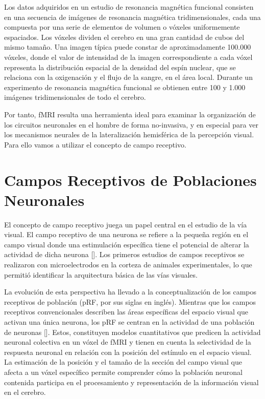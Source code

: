 Los datos adquiridos en un estudio de resonancia magnética funcional consisten en una secuencia de imágenes de resonancia magnética tridimensionales, cada una compuesta por una serie de elementos de volumen o vóxeles uniformemente espaciados. Los vóxeles dividen el cerebro en una gran cantidad de cubos del mismo tamaño. Una imagen típica puede constar de aproximadamente 100.000 vóxeles, donde el valor de intensidad de la imagen correspondiente a cada vóxel representa la distribución espacial de la densidad del espín nuclear, que se relaciona con la oxigenación y el flujo de la sangre, en el área local. Durante un experimento de resonancia magnética funcional se obtienen entre 100 y 1.000 imágenes tridimensionales de todo el cerebro. 

Por tanto, fMRI resulta una herramienta ideal para examinar la organización de los circuitos neuronales en el hombre de forma no-invasiva, y en especial para ver los mecanismos neurales de la lateralización hemisférica de la percepción visual. Para ello vamos a utilizar el concepto de campo receptivo.

\section{Campos Receptivos de Poblaciones Neuronales}

El concepto de campo receptivo juega un papel central en el estudio de la vía visual. El campo receptivo de una neurona se refiere a la pequeña región en el campo visual donde una estimulación específica tiene el potencial de alterar la actividad de dicha neurona [\cite{kandel_principles_2021}]. Los primeros estudios de campos receptivos se realizaron con microelectrodos en la corteza de animales experimentales, lo que permitió identificar la arquitectura básica de las vías visuales. 

La evolución de esta perspectiva ha llevado a la conceptualización de los campos receptivos de población (pRF, por sus siglas en ingl\'es). Mientras que los campos receptivos convencionales describen las áreas específicas del espacio visual que activan una única neurona, los pRF se centran en la actividad de una población de neuronas [\cite{dumoulin_population_2008}]. Estos, constituyen modelos cuantitativos que predicen la actividad neuronal colectiva en un vóxel de fMRI y tienen en cuenta la selectividad de la respuesta neuronal en relación con la posición del estímulo en el espacio visual. La estimación de la posición y el tamaño de la sección del campo visual que afecta a un vóxel específico permite comprender cómo la población neuronal contenida participa en el procesamiento y representación de la información visual en el cerebro.


